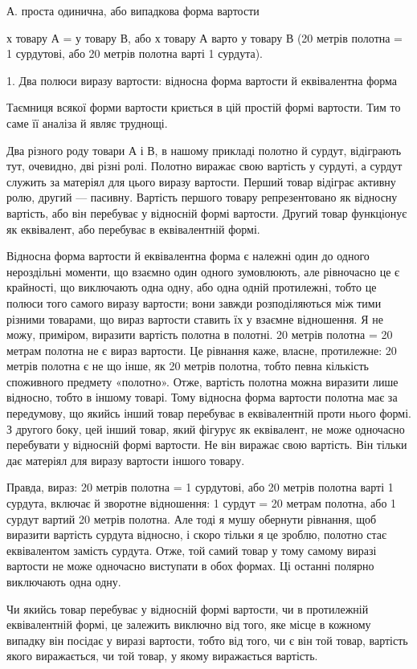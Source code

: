 А. проста одинична, або випадкова форма вартости

х товару А = у товару В, або х товару А варто у товару В
(20 метрів полотна = 1 сурдутові, або 20 метрів полотна варті 1 сурдута).

1. Два полюси виразу вартости: відносна форма вартости
й еквівалентна форма

Таємниця всякої форми вартости криється в цій простій формі
вартости. Тим то саме її аналіза й являє труднощі.

Два різного роду товари А і В, в нашому прикладі полотно
й сурдут, відіграють тут, очевидно, дві різні ролі. Полотно виражає
свою вартість у сурдуті, а сурдут служить за матеріял для
цього виразу вартости. Перший товар відіграє активну ролю,
другий — пасивну. Вартість першого товару репрезентовано як
відносну вартість, або він перебуває у відносній формі вартости.
Другий товар функціонує як еквівалент, або перебуває в еквівалентній
формі.

Відносна форма вартости й еквівалентна форма є належні один
до одного нероздільні моменти, що взаємно один одного зумовлюють,
але рівночасно це є крайності, що виключають одна одну,
або одна одній протилежні, тобто це полюси того самого виразу
вартости; вони завжди розподіляються між тими різними товарами,
що вираз вартости ставить їх у взаємне відношення. Я не
можу, приміром, виразити вартість полотна в полотні. 20 метрів
полотна = 20 метрам полотна не є вираз вартости. Це рівнання
каже, власне, протилежне: 20 метрів полотна є не що інше, як
20 метрів полотна, тобто певна кількість споживного предмету
«полотно». Отже, вартість полотна можна виразити лише відносно,
тобто в іншому товарі. Тому відносна форма вартости полотна
має за передумову, що якийсь інший товар перебуває в еквівалентній
проти нього формі. З другого боку, цей інший товар, який
фігурує як еквівалент, не може одночасно перебувати у відносній
формі вартости. Не він виражає свою вартість. Він тільки дає
матеріял для виразу вартости іншого товару.

Правда, вираз: 20 метрів полотна = 1 сурдутові, або 20 метрів
полотна варті 1 сурдута, включає й зворотне відношення:
1 сурдут = 20 метрам полотна, або 1 сурдут вартий 20 метрів
полотна. Але тоді я мушу обернути рівнання, щоб виразити вартість
сурдута відносно, і скоро тільки я це зроблю, полотно стає
еквівалентом замість сурдута. Отже, той самий товар у тому самому
виразі вартости не може одночасно виступати в обох формах.
Ці останні полярно виключають одна одну.

Чи якийсь товар перебуває у відносній формі вартости, чи в
протилежній еквівалентній формі, це залежить виключно від того,
яке місце в кожному випадку він посідає у виразі вартости, тобто
від того, чи є він той товар, вартість якого виражається, чи той
товар, у якому виражається вартість.
